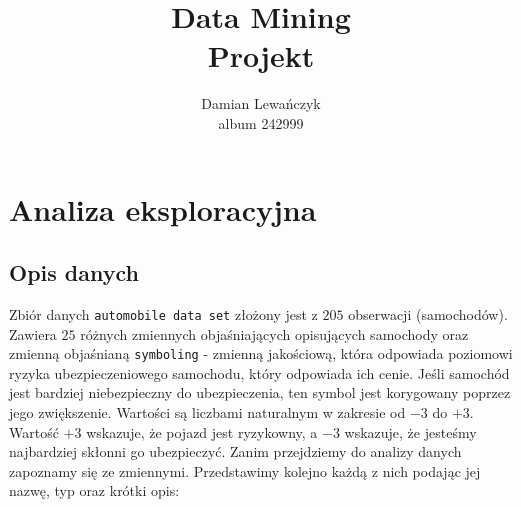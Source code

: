 \documentclass[12pt, a4paper]{article}\usepackage[]{graphicx}\usepackage[]{xcolor}
\begin{document}



\title{Data Mining\\
Projekt}
\author{Damian Lewańczyk \\ album 242999}
\maketitle
\tableofcontents

%

\section{Analiza eksploracyjna}  
\subsection{Opis danych}
%



Zbiór danych \texttt{automobile data set} złożony jest z $205$ obserwacji (samochodów). Zawiera $25$ różnych zmiennych objaśniających opisujących samochody oraz zmienną objaśnianą \texttt{symboling} - zmienną jakościową, która odpowiada poziomowi ryzyka ubezpieczeniowego samochodu, który odpowiada ich cenie. Jeśli samochód jest bardziej niebezpieczny do ubezpieczenia, ten symbol jest korygowany poprzez jego zwiększenie. Wartości są liczbami naturalnym w zakresie od $-3$ do $+3$. Wartość $+3$ wskazuje, że pojazd jest ryzykowny, a $-3$ wskazuje, że jesteśmy najbardziej skłonni go ubezpieczyć. Zanim przejdziemy do analizy danych zapoznamy się ze zmiennymi. Przedstawimy kolejno każdą z nich podając jej nazwę, typ oraz krótki opis:
\end{document}
